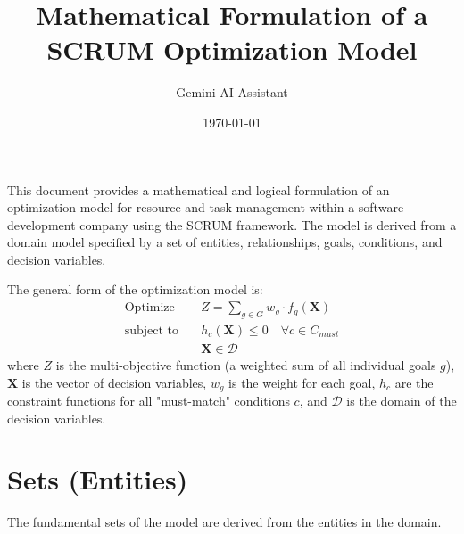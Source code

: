 \documentclass[11pt, a4paper]{article}
\title{Mathematical Formulation of a SCRUM Optimization Model}
\author{Gemini AI Assistant}
\date{\today}
\begin{document}
\maketitle
\thispagestyle{empty}

\newpage

\tableofcontents
\thispagestyle{empty}

\newpage
\setcounter{page}{1}

This document provides a mathematical and logical formulation of an optimization model for resource and task management within a software development company using the SCRUM framework. The model is derived from a domain model specified by a set of entities, relationships, goals, conditions, and decision variables.

The general form of the optimization model is:
\begin{align*}
    \text{Optimize} \quad & Z = \sum_{g \in G} w_g \cdot f_g(\mathbf{X}) \\
    \text{subject to} \quad & h_c(\mathbf{X}) \leq 0 \quad \forall c \in C_{must} \\
    & \mathbf{X} \in \mathcal{D}
\end{align*}
where $Z$ is the multi-objective function (a weighted sum of all individual goals $g$), $\mathbf{X}$ is the vector of decision variables, $w_g$ is the weight for each goal, $h_c$ are the constraint functions for all "must-match" conditions $c$, and $\mathcal{D}$ is the domain of the decision variables.

\section{Sets (Entities)}
The fundamental sets of the model are derived from the entities in the domain.
\end{document}

